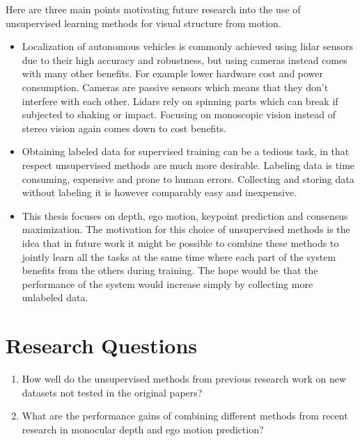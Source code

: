 Here are three main points motivating future research into the use of unsupervised learning methods for visual structure from motion.


\begin{itemize}
	\item Localization of autonomous vehicles is commonly  achieved using lidar sensors due to their high accuracy and robustness, but using cameras instead comes with many other benefits\cite{lidarvscamera}. For example lower hardware cost and power consumption. Cameras are passive sensors which means that they don't interfere with each other. Lidars rely on spinning parts which can break if subjected to shaking or impact. Focusing on monoscopic vision instead of stereo vision again comes down to cost benefits.
	
	\item Obtaining labeled data for supervised training can be a tedious task, in that respect unsupervised methods are much more desirable. Labeling data is time consuming, expensive and prone to human errors. Collecting and storing data without labeling it is however comparably easy and inexpensive.
	
	\item This thesis focuses on depth, ego motion, keypoint prediction and consensus maximization. The motivation for this choice of unsupervised methods is the idea that in future work it might be possible to combine these methods to jointly learn all the tasks at the same time where each part of the system benefits from the others during training. The hope would be that the performance of the system would increase simply by collecting more unlabeled data.
\end{itemize}

\section{Research Questions}

\begin{enumerate}
	
	\item How well do the unsupervised methods from previous research work on new datasets not tested in the original papers?
	
	\item What are the performance gains of combining different methods from recent research in monocular depth and ego motion prediction?
	
\end{enumerate}

